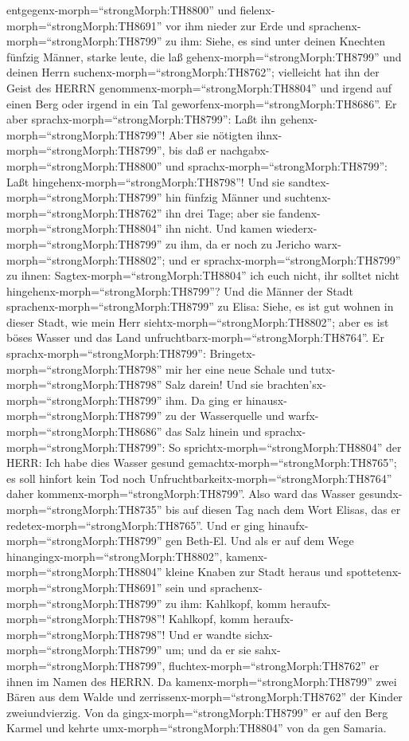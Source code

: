 entgegenx-morph=``strongMorph:TH8800'' und
fielenx-morph=``strongMorph:TH8691'' vor ihm nieder zur Erde
 und sprachenx-morph=``strongMorph:TH8799'' zu ihm: Siehe,
es sind unter deinen Knechten fünfzig Männer, starke leute, die laß
gehenx-morph=``strongMorph:TH8799'' und deinen Herrn
suchenx-morph=``strongMorph:TH8762''; vielleicht hat ihn der Geist des
HERRN genommenx-morph=``strongMorph:TH8804'' und irgend auf einen Berg
oder irgend in ein Tal geworfenx-morph=``strongMorph:TH8686''. Er aber
sprachx-morph=``strongMorph:TH8799'': Laßt ihn
gehenx-morph=``strongMorph:TH8799''!  Aber sie nötigten
ihnx-morph=``strongMorph:TH8799'', bis daß er
nachgabx-morph=``strongMorph:TH8800'' und
sprachx-morph=``strongMorph:TH8799'': Laßt
hingehenx-morph=``strongMorph:TH8798''! Und sie
sandtex-morph=``strongMorph:TH8799'' hin fünfzig Männer und
suchtenx-morph=``strongMorph:TH8762'' ihn drei Tage; aber sie
fandenx-morph=``strongMorph:TH8804'' ihn nicht.  Und kamen
wiederx-morph=``strongMorph:TH8799'' zu ihm, da er noch zu Jericho
warx-morph=``strongMorph:TH8802''; und er
sprachx-morph=``strongMorph:TH8799'' zu ihnen:
Sagtex-morph=``strongMorph:TH8804'' ich euch nicht, ihr solltet nicht
hingehenx-morph=``strongMorph:TH8799''?  Und die Männer der
Stadt sprachenx-morph=``strongMorph:TH8799'' zu Elisa: Siehe, es ist gut
wohnen in dieser Stadt, wie mein Herr
siehtx-morph=``strongMorph:TH8802''; aber es ist böses Wasser und das
Land unfruchtbarx-morph=``strongMorph:TH8764''.  Er
sprachx-morph=``strongMorph:TH8799'':
Bringetx-morph=``strongMorph:TH8798'' mir her eine neue Schale und
tutx-morph=``strongMorph:TH8798'' Salz darein! Und sie
brachten'sx-morph=``strongMorph:TH8799'' ihm.  Da ging er
hinausx-morph=``strongMorph:TH8799'' zu der Wasserquelle und
warfx-morph=``strongMorph:TH8686'' das Salz hinein und
sprachx-morph=``strongMorph:TH8799'': So
sprichtx-morph=``strongMorph:TH8804'' der HERR: Ich habe dies Wasser
gesund gemachtx-morph=``strongMorph:TH8765''; es soll hinfort kein Tod
noch Unfruchtbarkeitx-morph=``strongMorph:TH8764'' daher
kommenx-morph=``strongMorph:TH8799''.  Also ward das Wasser
gesundx-morph=``strongMorph:TH8735'' bis auf diesen Tag nach dem Wort
Elisas, das er redetex-morph=``strongMorph:TH8765''.  Und
er ging hinaufx-morph=``strongMorph:TH8799'' gen Beth-El. Und als er auf
dem Wege hinangingx-morph=``strongMorph:TH8802'',
kamenx-morph=``strongMorph:TH8804'' kleine Knaben zur Stadt heraus und
spottetenx-morph=``strongMorph:TH8691'' sein und
sprachenx-morph=``strongMorph:TH8799'' zu ihm: Kahlkopf, komm
heraufx-morph=``strongMorph:TH8798''! Kahlkopf, komm
heraufx-morph=``strongMorph:TH8798''!  Und er wandte
sichx-morph=``strongMorph:TH8799'' um; und da er sie
sahx-morph=``strongMorph:TH8799'', fluchtex-morph=``strongMorph:TH8762''
er ihnen im Namen des HERRN. Da kamenx-morph=``strongMorph:TH8799'' zwei
Bären aus dem Walde und zerrissenx-morph=``strongMorph:TH8762'' der
Kinder zweiundvierzig.  Von da
gingx-morph=``strongMorph:TH8799'' er auf den Berg Karmel und kehrte
umx-morph=``strongMorph:TH8804'' von da gen Samaria.

